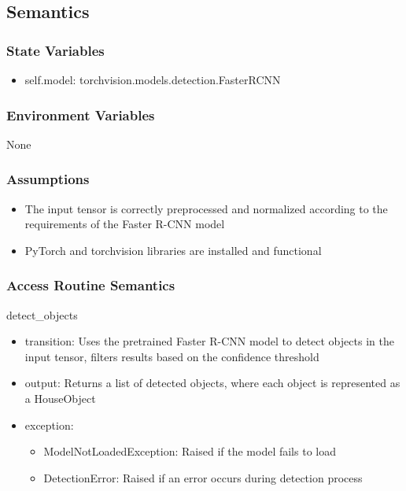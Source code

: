 \documentclass[12pt, titlepage]{article}
\begin{document}
\subsection{Semantics}

\subsubsection{State Variables}
\begin{itemize}
	\item self.model: torchvision.models.detection.FasterRCNN
\end{itemize}


\subsubsection{Environment Variables}
None

\subsubsection{Assumptions}
\begin{itemize}
  \item The input tensor is correctly preprocessed and normalized according to the requirements of the Faster R-CNN model
  \item PyTorch and torchvision libraries are installed and functional
\end{itemize}


\subsubsection{Access Routine Semantics}

\noindent detect{\_}objects
\begin{itemize}
\item transition: Uses the pretrained Faster R-CNN model to detect objects in the input tensor, filters results based on the confidence threshold
\item output: Returns a list of detected objects, where each object is represented as a HouseObject
\item exception: 
\begin{itemize}
  \item ModelNotLoadedException: Raised if the model fails to load
  \item DetectionError: Raised if an error occurs during detection process
\end{itemize}

\end{itemize}
\end{document}

